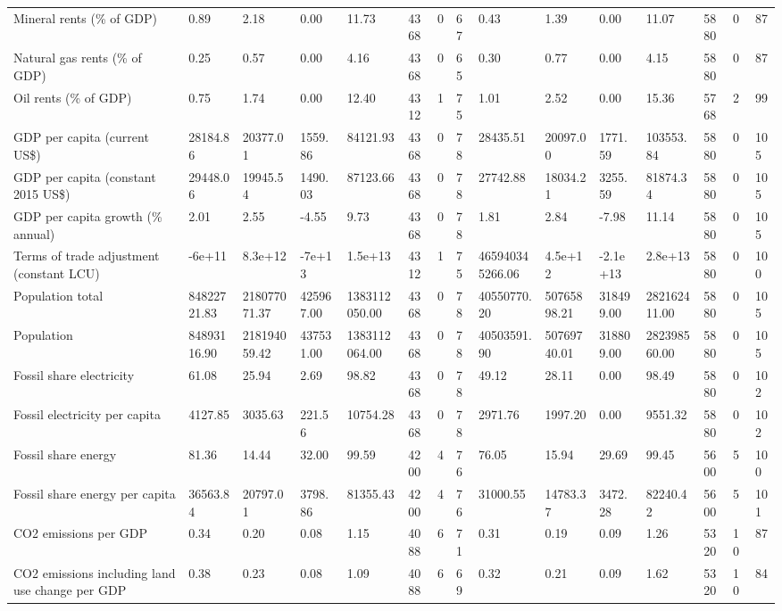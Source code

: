 \begin{longtable}{lllllllllllllll}
\addlinespace
Mineral rents (\% of GDP) & 0.89 & 2.18 & 0.00 & 11.73 & 4368 & 0 & 67 & 0.43 & 1.39 & 0.00 & 11.07 & 5880 & 0 & 87\\
Natural gas rents (\% of GDP) & 0.25 & 0.57 & 0.00 & 4.16 & 4368 & 0 & 65 & 0.30 & 0.77 & 0.00 & 4.15 & 5880 & 0 & 87\\
Oil rents (\% of GDP) & 0.75 & 1.74 & 0.00 & 12.40 & 4312 & 1 & 75 & 1.01 & 2.52 & 0.00 & 15.36 & 5768 & 2 & 99\\
GDP per capita (current US\$) & 28184.86 & 20377.01 & 1559.86 & 84121.93 & 4368 & 0 & 78 & 28435.51 & 20097.00 & 1771.59 & 103553.84 & 5880 & 0 & 105\\
GDP per capita (constant 2015 US\$) & 29448.06 & 19945.54 & 1490.03 & 87123.66 & 4368 & 0 & 78 & 27742.88 & 18034.21 & 3255.59 & 81874.34 & 5880 & 0 & 105\\
\addlinespace
GDP per capita growth (\% annual) & 2.01 & 2.55 & -4.55 & 9.73 & 4368 & 0 & 78 & 1.81 & 2.84 & -7.98 & 11.14 & 5880 & 0 & 105\\
Terms of trade adjustment (constant LCU) & -6e+11 & 8.3e+12 & -7e+13 & 1.5e+13 & 4312 & 1 & 75 & 465940345266.06 & 4.5e+12 & -2.1e+13 & 2.8e+13 & 5880 & 0 & 100\\
Population total & 84822721.83 & 218077071.37 & 425967.00 & 1383112050.00 & 4368 & 0 & 78 & 40550770.20 & 50765898.21 & 318499.00 & 282162411.00 & 5880 & 0 & 105\\
Population & 84893116.90 & 218194059.42 & 437531.00 & 1383112064.00 & 4368 & 0 & 78 & 40503591.90 & 50769740.01 & 318809.00 & 282398560.00 & 5880 & 0 & 105\\
Fossil share electricity & 61.08 & 25.94 & 2.69 & 98.82 & 4368 & 0 & 78 & 49.12 & 28.11 & 0.00 & 98.49 & 5880 & 0 & 102\\
\addlinespace
Fossil electricity per capita & 4127.85 & 3035.63 & 221.56 & 10754.28 & 4368 & 0 & 78 & 2971.76 & 1997.20 & 0.00 & 9551.32 & 5880 & 0 & 102\\
Fossil share energy & 81.36 & 14.44 & 32.00 & 99.59 & 4200 & 4 & 76 & 76.05 & 15.94 & 29.69 & 99.45 & 5600 & 5 & 100\\
Fossil share energy per capita & 36563.84 & 20797.01 & 3798.86 & 81355.43 & 4200 & 4 & 76 & 31000.55 & 14783.37 & 3472.28 & 82240.42 & 5600 & 5 & 101\\
CO2 emissions per GDP & 0.34 & 0.20 & 0.08 & 1.15 & 4088 & 6 & 71 & 0.31 & 0.19 & 0.09 & 1.26 & 5320 & 10 & 87\\
CO2 emissions including land use change per GDP & 0.38 & 0.23 & 0.08 & 1.09 & 4088 & 6 & 69 & 0.32 & 0.21 & 0.09 & 1.62 & 5320 & 10 & 84\\

\end{longtable}
